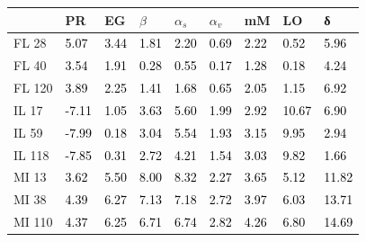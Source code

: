 \begin{tabular}{lllllllll}
\toprule
 & PR & EG & $β$ & $α_s$ & $α_v$ & mM & LO & δ \\
\midrule
FL 28 & \textcolor{black}{ 5.07 } & \textcolor{black}{ 3.44 } & \textcolor{black}{ 1.81 } & \textcolor{black}{ 2.20 } & \textcolor{black}{ 0.69 } & \textcolor{black}{ 2.22 } & \textcolor{black}{ 0.52 } & \textcolor{black}{ 5.96 } \\
FL 40 & \textcolor{black}{ 3.54 } & \textcolor{black}{ 1.91 } & \textcolor{black}{ 0.28 } & \textcolor{black}{ 0.55 } & \textcolor{black}{ 0.17 } & \textcolor{black}{ 1.28 } & \textcolor{black}{ 0.18 } & \textcolor{black}{ 4.24 } \\
FL 120 & \textcolor{black}{ 3.89 } & \textcolor{black}{ 2.25 } & \textcolor{black}{ 1.41 } & \textcolor{black}{ 1.68 } & \textcolor{black}{ 0.65 } & \textcolor{black}{ 2.05 } & \textcolor{black}{ 1.15 } & \textcolor{black}{ 6.92 } \\
IL 17 & \textcolor{black}{ -7.11 } & \textcolor{black}{ 1.05 } & \textcolor{black}{ 3.63 } & \textcolor{black}{ 5.60 } & \textcolor{black}{ 1.99 } & \textcolor{black}{ 2.92 } & \textcolor{black}{ 10.67 } & \textcolor{black}{ 6.90 } \\
IL 59 & \textcolor{black}{ -7.99 } & \textcolor{black}{ 0.18 } & \textcolor{black}{ 3.04 } & \textcolor{black}{ 5.54 } & \textcolor{black}{ 1.93 } & \textcolor{black}{ 3.15 } & \textcolor{black}{ 9.95 } & \textcolor{black}{ 2.94 } \\
IL 118 & \textcolor{black}{ -7.85 } & \textcolor{black}{ 0.31 } & \textcolor{black}{ 2.72 } & \textcolor{black}{ 4.21 } & \textcolor{black}{ 1.54 } & \textcolor{black}{ 3.03 } & \textcolor{black}{ 9.82 } & \textcolor{black}{ 1.66 } \\
MI 13 & \textcolor{black}{ 3.62 } & \textcolor{black}{ 5.50 } & \textcolor{black}{ 8.00 } & \textcolor{black}{ 8.32 } & \textcolor{black}{ 2.27 } & \textcolor{black}{ 3.65 } & \textcolor{black}{ 5.12 } & \textcolor{black}{ 11.82 } \\
MI 38 & \textcolor{black}{ 4.39 } & \textcolor{black}{ 6.27 } & \textcolor{black}{ 7.13 } & \textcolor{black}{ 7.18 } & \textcolor{black}{ 2.72 } & \textcolor{black}{ 3.97 } & \textcolor{black}{ 6.03 } & \textcolor{black}{ 13.71 } \\
MI 110 & \textcolor{black}{ 4.37 } & \textcolor{black}{ 6.25 } & \textcolor{black}{ 6.71 } & \textcolor{black}{ 6.74 } & \textcolor{black}{ 2.82 } & \textcolor{black}{ 4.26 } & \textcolor{black}{ 6.80 } & \textcolor{black}{ 14.69 } \\

\end{tabular}
